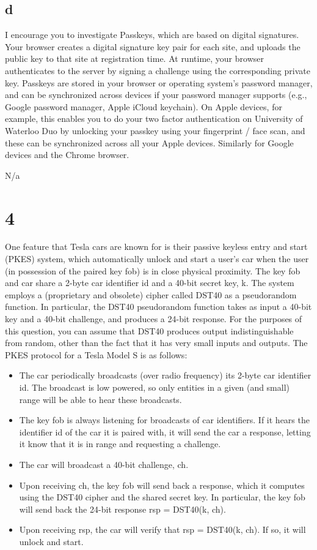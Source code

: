 \documentclass[11pt]{article}
\begin{document}
\subsection{d}

I encourage you to investigate Passkeys, which are based on digital signatures. Your browser creates a digital signature key pair for each site, and uploads the public key to that site at registration time. At runtime, your browser authenticates to the server by signing a challenge using the corresponding private key. Passkeys are stored in your browser or operating system's password manager, and can be synchronized across devices if your password manager supports (e.g., Google password manager, Apple iCloud keychain). On Apple devices, for example, this enables you to do your two factor authentication on University of Waterloo Duo by unlocking your passkey using your fingerprint / face scan, and these can be synchronized across all your Apple devices. Similarly for Google devices and the Chrome browser.

N/a

\newpage

\section{4}

One feature that Tesla cars are known for is their passive keyless entry and start (PKES) system, which automatically unlock and start a user's car when the user (in possession of the paired key fob) is in close physical proximity. The key fob and car share a 2-byte car identifier id and a 40-bit secret key, k.
The system employs a (proprietary and obsolete) cipher called DST40 as a pseudorandom function. In particular, the DST40 pseudorandom function takes as input a 40-bit key and a 40-bit challenge, and produces a 24-bit response. For the purposes of this question, you can assume that DST40 produces output indistinguishable from random, other than the fact that it has very small inputs and outputs.
The PKES protocol for a Tesla Model S is as follows:
\begin{itemize}
  \item The car periodically broadcasts (over radio frequency) its 2-byte car identifier id. The broadcast is low powered, so only entities in a given (and small) range will be able to hear these broadcasts.
  \item The key fob is always listening for broadcasts of car identifiers. If it hears the identifier id of the car it is paired with, it will send the car a response, letting it know that it is in range and
requesting a challenge.
  \item The car will broadcast a 40-bit challenge, ch.
  \item Upon receiving ch, the key fob will send back a response, which it computes using the DST40 cipher and the shared secret key. In particular, the key fob will send back the 24-bit response rsp = DST40(k, ch).
  \item Upon receiving rsp, the car will verify that rsp = DST40(k, ch). If so, it will unlock and start.
\end{itemize}
\end{document}
